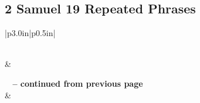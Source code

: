 \subsection{2 Samuel 19 Repeated Phrases}


\normalsize
 
\begin{center}
\begin{longtable}{|p{3.0in}|p{0.5in}|}
\caption[2 Samuel 19 Repeated Phrases]{2 Samuel 19 Repeated Phrases}\label{table:Repeated Phrases 2 Samuel 19} \\
\hline {} &  \\ \hline 
\endfirsthead
 
{{\bfseries \tablename\ \thetable{} -- continued from previous page}} \\  
\hline {} &  \\ \hline 
\endhead
 

\end{longtable}
\end{center}
